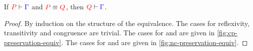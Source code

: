 \begin{lemma}\label{thm:nc-preservation-equiv}
  If $\seq[{ P }]{ \Gamma }$ and $\tm{P} \equiv \tm{Q}$,
  then $\seq[{ Q }]{ \Gamma }$.
\end{lemma}
\begin{proof}
  By induction on the structure of the equivalence. The cases for reflexivity,
  transitivity and congruence are trivial. The cases for \cpEquivCutComm and
   are given in \cref{fig:cp-preservation-equiv}.
  The cases for \ncEquivPoolComm and  are given in
  \cref{fig:nc-preservation-equiv}.
\end{proof}
